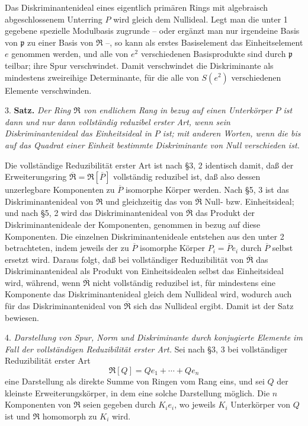 \documentclass[11pt]{article}
\providecommand{\mR}{\mathfrak{R}}
\providecommand{\bR}{\overline{\mathfrak{R}}}
\providecommand{\mpideal}{\mathfrak{p}}
\providecommand{\bP}{\overline{P}}
\begin{document}
Das Diskriminantenideal eines eigentlich primären Rings mit algebraisch abgeschlossenem Unterring $P$ wird gleich dem Nullideal. Legt man die unter 1 gegebene spezielle Modulbasis zugrunde -- oder ergänzt man nur irgendeine Basis von $\mpideal$ zu einer Basis von $\mR$ --, so kann als erstes Basiselement das Einheitselement $e$ genommen werden, und alle von $e^2$ verschiedenen Basisprodukte sind durch $\mpideal$ teilbar; ihre Spur verschwindet. Damit verschwindet die Diskriminante als mindestens zweireihige Determinante, für die alle von $S(e^2)$ verschiedenen Elemente verschwinden.

3. \textbf{Satz.} \emph{Der Ring $\mR$ von endlichem Rang in bezug auf einen Unterkörper $P$ ist dann und nur dann vollständig reduzibel erster Art, wenn sein Diskriminantenideal das Einheitsideal in $P$ ist; mit anderen Worten, wenn die bis auf das Quadrat einer Einheit bestimmte Diskriminante von Null verschieden ist.}

Die vollständige Reduzibilität erster Art ist nach §3, 2 identisch damit, daß der Erweiterungsring $\bR=\mR[\bP]$ vollständig reduzibel ist, daß also dessen unzerlegbare Komponenten zu $\bP$ isomorphe Körper werden. Nach §5, 3 ist das Diskriminantenideal von $\mR$ und gleichzeitig das von $\bR$ Null- bzw. Einheitsideal; und nach §5, 2 wird das Diskriminantenideal von $\bR$ das Produkt der Diskriminantenideale der Komponenten, genommen in bezug auf diese Komponenten. Die einzelnen Diskriminantenideale entstehen aus den unter 2 betrachteten, indem jeweils der zu $\bP$ isomorphe Körper $P_i=\bP e_i$ durch $\bP$ selbst ersetzt wird. Daraus folgt, daß bei vollständiger Reduzibilität von $\bR$ das Diskriminantenideal als Produkt von Einheitsidealen selbst das Einheitsideal wird, während, wenn $\bR$ nicht vollständig reduzibel ist, für mindestens eine Komponente das Diskriminantenideal gleich dem Nullideal wird, wodurch auch für das Diskriminantenideal von $\bR$ sich das Nullideal ergibt. Damit ist der Satz bewiesen.

4. \emph{Darstellung von Spur, Norm und Diskriminante durch konjugierte Elemente im Fall der vollständigen Reduzibilität erster Art.} Sei nach §3, 3 bei vollständiger Reduzibilität erster Art
\[
        \mR[Q]=Qe_1+\cdots+Qe_n
\]
eine Darstellung als direkte Summe von Ringen vom Rang eins, und sei $Q$ der kleinste Erweiterungskörper, in dem eine solche Darstellung möglich. Die $n$ Komponenten von $\mR$ seien gegeben durch $K_i e_i$, wo jeweils $K_i$ Unterkörper von $Q$ ist und $\mR$ homomorph zu $K_i$ wird.
\end{document}
